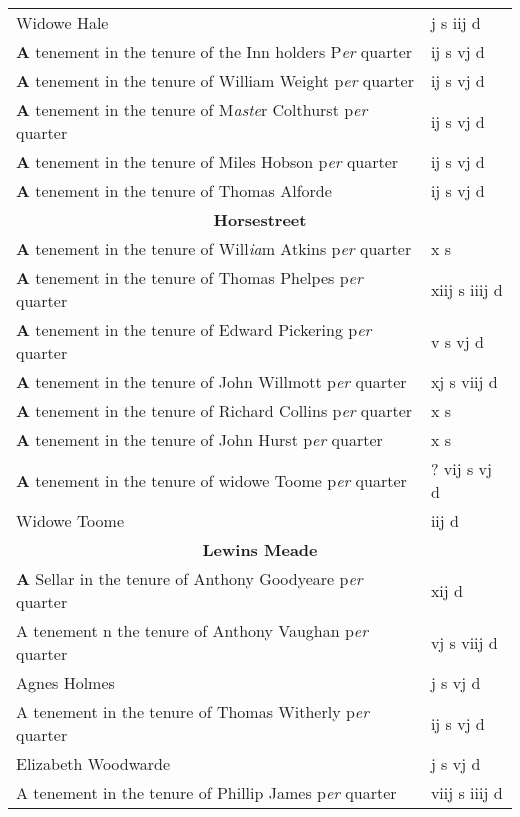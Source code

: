 \documentclass[a4paper,12pt]{article}
\begin{document}
\begin{landscape}
\begin{longtable}{l l}
Widowe Hale & j s iij d \\[0.15cm]
\textbf{A} tenement in the tenure of the Inn holders P\textit{er} quarter & ij s vj d \\[0.15cm]
\textbf{A} tenement in the tenure of William Weight p\textit{er} quarter & ij s vj d \\[0.15cm]
\textbf{A} tenement in the tenure of M\textit{aste}r Colthurst p\textit{er} quarter & ij s vj d \\[0.15cm]
\textbf{A} tenement in the tenure of Miles Hobson p\textit{er} quarter & ij s vj d \\[0.15cm]
\textbf{A} tenement in the tenure of Thomas Alforde & ij s vj d \\[0.25cm]
\multicolumn{2}{c}{\textbf{Horsestreet}}\\[0.15cm]
\textbf{A} tenement in the tenure of Will\textit{ia}m Atkins p\textit{er} quarter & x s \\[0.15cm]
\textbf{A} tenement in the tenure of Thomas Phelpes p\textit{er} quarter & xiij s iiij d \\[0.15cm]
\textbf{A} tenement in the tenure of Edward Pickering p\textit{er} quarter & v s vj d \\[0.15cm]
\textbf{A} tenement in the tenure of John Willmott p\textit{er} quarter & xj s viij d \\[0.15cm]
\textbf{A} tenement in the tenure of Richard Collins p\textit{er} quarter & x s \\[0.15cm]
\textbf{A} tenement in the tenure of John Hurst p\textit{er} quarter & x s \\[0.15cm]
\textbf{A} tenement in the tenure of widowe Toome p\textit{er} quarter & ? vij s vj d \\[0.15cm]
Widowe Toome & iij d \\[0.25cm]
\multicolumn{2}{c}{\textbf{Lewins Meade}}\\[0.15cm]
\textbf{A} Sellar in the tenure of Anthony Goodyeare p\textit{er} quarter & xij d \\[0.15cm]
A tenement n the tenure of Anthony Vaughan p\textit{er} quarter & vj s viij d \\[0.15cm]
Agnes Holmes & j s vj d \\[0.15cm]
A tenement in the tenure of Thomas Witherly p\textit{er} quarter & ij s vj d  \\[0.15cm]
Elizabeth Woodwarde & j s vj d \\[0.15cm]
A tenement in the tenure of Phillip James p\textit{er} quarter & viij s iiij d \\[0.15cm]

\end{longtable}
\end{landscape}
\end{document}
